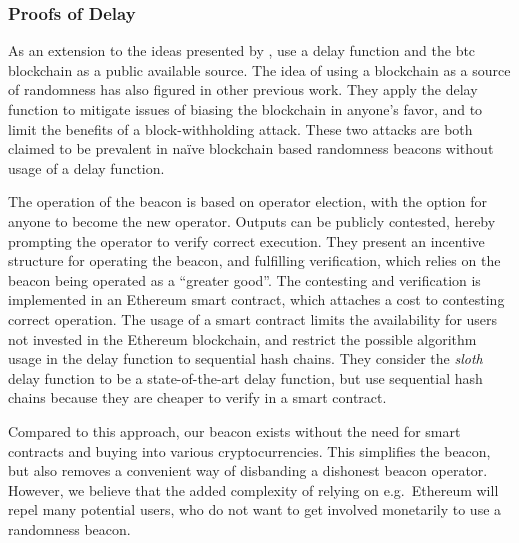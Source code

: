 \subsubsection{Proofs of Delay}%
\label{ssub:proofs_of_delay}
As an extension to the ideas presented by \citet{randomzoo}, \citet{bunz2017proofsof} use a delay function and the \gls{btc} blockchain as a public available source. The idea of using a blockchain as a source of randomness has also figured in other previous work.
They apply the delay function to mitigate issues of biasing the blockchain in anyone's favor, and to limit the benefits of a block-withholding attack.
These two attacks are both claimed to be prevalent in naïve blockchain based randomness beacons without usage of a delay function.

The operation of the beacon is based on operator election, with the option for anyone to become the new operator.
Outputs can be publicly contested, hereby prompting the operator to verify correct execution.
They present an incentive structure for operating the beacon, and fulfilling verification, which relies on the beacon being operated as a \enquote{greater good}.
The contesting and verification is implemented in an Ethereum smart contract, which attaches a cost to contesting correct operation.
The usage of a smart contract limits the availability for users not invested in the Ethereum blockchain, and restrict the possible algorithm usage in the delay function to sequential hash chains.
They consider the \textit{sloth} delay function to be a state-of-the-art delay function, but use sequential hash chains because they are cheaper to verify in a smart contract.

Compared to this approach, our beacon exists without the need for smart contracts and buying into various cryptocurrencies.
This simplifies the beacon, but also removes a convenient way of disbanding a dishonest beacon operator.
However, we believe that the added complexity of relying on e.g.\ Ethereum will repel many potential users, who do not want to get involved monetarily to use a randomness beacon.

